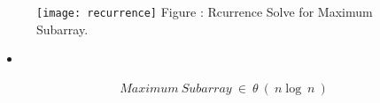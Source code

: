 \begin{figure}[H]
\texttt{[image: recurrence]}
\centering \linebreak \linebreak Figure : Rcurrence Solve for Maximum Subarray.
\end{figure} 

\begin{itemize}
\item {\bfseries\itshape\color{Violet}{Finally:}}
\end{itemize} \hfill

\begin{ceqn}
\begin{align}
Maximum\  Subarray\ \in\ \theta\ (\ n\log\ n\ )
\end{align}
\end{ceqn}
\pagebreak